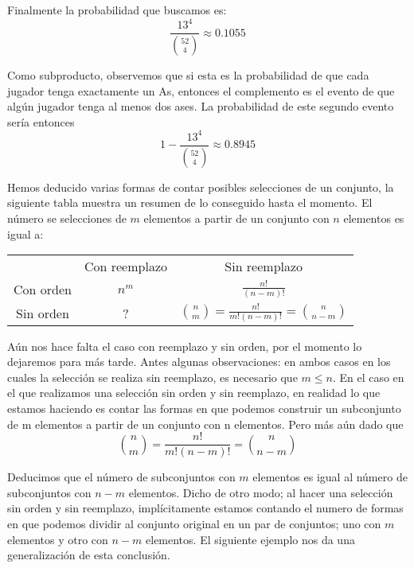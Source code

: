 \documentclass[14pt]{extreport}
\theoremstyle{definicion}
\theoremstyle{propiedad}
\begin{document}
Finalmente la probabilidad que buscamos es:
$$
  \frac{13^4}{\binom{52}{4}}  \approx 0.1055
$$

Como subproducto, observemos que si esta es la probabilidad de que cada jugador tenga exactamente un As, entonces el complemento es el evento de que algún jugador tenga al menos dos ases. La probabilidad de este segundo evento sería entonces
$$
  1-\frac{13^4}{\binom{52}{4}} \approx 0.8945
$$

Hemos deducido varias formas de contar posibles selecciones de un conjunto, la siguiente tabla muestra un resumen de lo conseguido hasta el momento. El número se selecciones de $m$ elementos a partir de un conjunto con $n$ elementos es igual a:
\begin{center}
  \begin{table}
    \begin{tabular}{c|c|c|}
      \multicolumn{1}{c}{}           & \multicolumn{1}{c}{Con reemplazo} & \multicolumn{1}{c}{Sin reemplazo}                   \\[0.5ex] \cline{2-3}
      \multicolumn{1}{c|}{Con orden} & $n^m$                             & $\frac{n!}{(n-m)!}$                                 \\[0.5ex]\cline{2-3}
      \multicolumn{1}{c|}{Sin orden} & ?                                 & $\binom{n}{m} = \frac{n!}{m!(n-m)!}=\binom{n}{n-m}$ \\\cline{2-3}
    \end{tabular}
  \end{table}
\end{center}
Aún nos hace falta el caso con reemplazo y sin orden, por el momento lo dejaremos para más tarde. Antes algunas observaciones: en ambos casos en los cuales la selección se realiza sin reemplazo, es necesario que $m \leq n$.  En el caso en el que realizamos una selección sin orden y sin reemplazo, en realidad lo que estamos haciendo es contar las formas en que podemos construir un subconjunto de m elementos a partir de un conjunto con n elementos. Pero más aún dado que
$$
  \binom{n}{m} = \frac{n!}{m!(n-m)!}=\binom{n}{n-m}
$$

Deducimos que el número de subconjuntos con $m$ elementos es igual al número de subconjuntos con $n-m$ elementos. Dicho de otro modo; al hacer una selección sin orden y sin reemplazo, implícitamente estamos contando el numero de formas en que podemos dividir al conjunto original en un par de conjuntos; uno con $m$ elementos y otro con $n - m$ elementos. El siguiente ejemplo nos da una generalización de esta conclusión.
\end{document}
